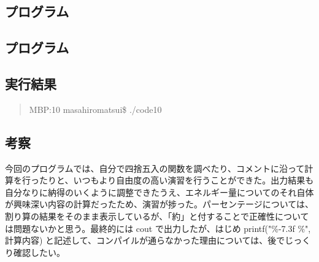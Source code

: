 \documentclass[11pt,a4paper]{jsarticle}
\begin{document}
\subsection{プログラム}
\label{sec:prog-list1}

%
\subsection{プログラム}
\label{sec:prog-list1}

%
\label{sec:results1}
\subsection{実行結果}
\begin{quote}           %
MBP:10 masahiromatsui\$ ./code10 \\

\end{quote}

%
\subsection{考察}
今回のプログラムでは、自分で四捨五入の関数を調べたり、コメントに沿って計算を行ったりと、いつもより自由度の高い演習を行うことができた。出力結果も自分なりに納得のいくように調整できたうえ、エネルギー量についてのそれ自体が興味深い内容の計算だったため、演習が捗った。パーセンテージについては、割り算の結果をそのまま表示しているが、「約」と付することで正確性については問題ないかと思う。最終的には cout で出力したが、はじめ printf("\%-7.3f \%", 計算内容) と記述して、コンパイルが通らなかった理由については、後でじっくり確認したい。
%
\end{document}

